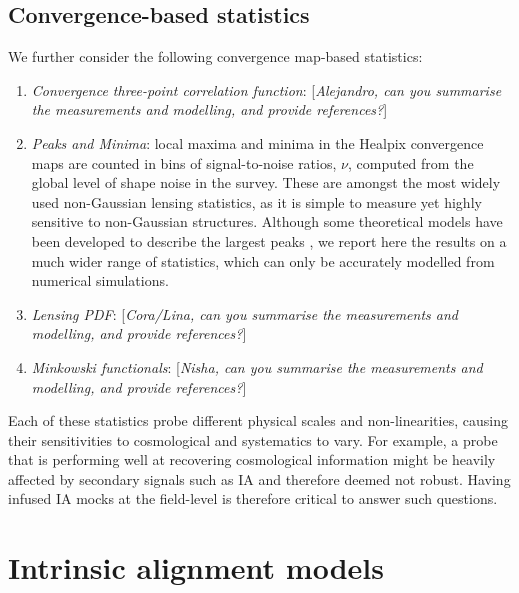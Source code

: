\documentclass[useAMS,usenatbib]{mn2e}
\begin{document}
\subsection{Convergence-based statistics}

We further consider the following convergence map-based statistics:
\begin{enumerate}
\item {\it Convergence three-point correlation function}: [{\it Alejandro, can you summarise the measurements and modelling, and provide references?}]
\item {\it Peaks and Minima}: local maxima and minima in the {\sc Healpix} convergence maps are counted in bins of signal-to-noise ratios, $\nu$, computed from the global level of shape noise in the survey. These are amongst the most widely used non-Gaussian lensing statistics, as it is simple to measure yet highly sensitive to non-Gaussian structures. Although some theoretical models have been developed to describe the largest peaks \citep[see][]{Shan18, HSCY1_Peaks_th}, we report here the results on a much wider range of statistics, which can only be accurately modelled from numerical simulations.
\item {\it Lensing PDF}:  [{\it Cora/Lina, can you summarise the measurements and modelling, and provide references?}]
\item {\it Minkowski functionals}: [{\it Nisha, can you summarise the measurements and modelling, and provide references?}]
\end{enumerate}

 
 Each of these statistics probe different physical scales and non-linearities, causing their sensitivities to cosmological and systematics to vary. For example, a probe that is performing well at recovering cosmological information might be heavily affected by secondary signals such as IA and therefore deemed not robust. Having infused IA mocks at the field-level is therefore critical to answer such questions.
 
 
 \section{Intrinsic alignment models}
 \label{sec:IA_th}
 
\end{document}

